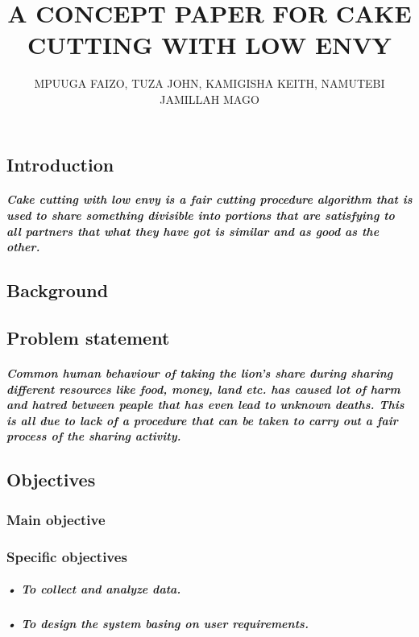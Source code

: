 \documentclass[12pt]{report}
\title{\textbf{A CONCEPT PAPER FOR CAKE CUTTING WITH LOW ENVY}}
\author{MPUUGA FAIZO, TUZA JOHN, KAMIGISHA KEITH, NAMUTEBI JAMILLAH MAGO}
\begin{document}
\maketitle
\chapter{}
\section{Introduction} 
\paragraph{Cake cutting with low envy is a fair cutting procedure algorithm that is used to share something divisible into portions that are satisfying to all partners that what they have got is similar and as good as the other. }


\section{Background}
\section{Problem statement}
\paragraph{Common human behaviour of taking the lion's share during sharing different resources like food, money, land etc. has caused lot of harm and hatred between peaple that has even lead to unknown deaths. This is all due to lack of a procedure that can be taken to carry out a fair process of the sharing activity. }
\section{Objectives}
\subsection{Main objective}
\subsection{Specific objectives}
\paragraph{•	To collect and analyze data.}
\paragraph{•	To design the system basing on user requirements.}
\end{document}
